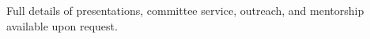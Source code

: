 \documentclass[letterpaper,10pt]{article}
\makeatletter
\newcommand{\resumeSubheading}[4]{
  \vspace{-1pt}\item
    \begin{tabular*}{0.97\textwidth}[t]{l@{\extracolsep{\fill}}r}
      \textbf{#1} & #2 \\
      \textit{\small#3} & \textit{\small #4} \\
    \end{tabular*}\vspace{-5pt}
}
\newcommand{\resumeSubHeadingListStart}{\begin{itemize}[leftmargin=*]}
\newcommand{\resumeSubHeadingListEnd}{\end{itemize}}
\makeatother
\begin{document}
\centerline{\small{Full details of presentations, committee service, outreach, and mentorship available upon request.}}





\end{document}
